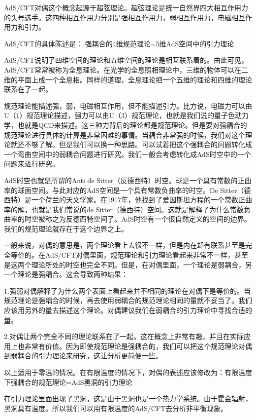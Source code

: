 
AdS/CFT对偶这个概念起源于超弦理论。超弦理论是统一自然界四大相互作用力的头号选手。这四种相互作用力分别是强相互作用力，弱相互作用力，电磁相互作用力和引力。

AdS/CFT的具体陈述是：
强耦合的4维规范理论=5维AdS空间中的引力理论

AdS/CFT说明了四维空间的理论和五维空间的理论是相互联系着的。由此可见，AdS/CFT常常被称为全息理论。在光学的全息照相理论中，三维的物体可以在二维的平面上成一个全息相。同样的道理，全息理论把一个五维的理论和四维的理论联系在了一起。

规范理论能描述强，弱，电磁相互作用，但不能描述引力。比方说，电磁力可以由U（1）规范理论描述，强力可以由U（3）规范理论，也就是我们说的量子色动力学，也就是QCD来描述。这三种力背后的理论都是规范理论。但是要对强耦合的规范理论进行具体的计算是非常困难的事情。当耦合非常强的时候，我们对这个理论就还不够了解。但是我们可以换一种思路。可以试着把这个强耦合的问题转化成一个弯曲空间中的弱耦合问题进行研究。我们一般会考虑转化成AdS时空中的一个问题来进行研究。

AdS时空也就是所谓的Anti de Sitter（反德西特）时空。球是一个具有常数的正曲率的球面空间。与此对应的AdS空间是一个具有常数负曲率的时空。De Sitter（德西特）是一个荷兰的天文学家。在1917年，他找到了爱因斯坦方程的一个常数正曲率的解，也就是我们常说的de Sitter（德西特）空间。这就是解释了为什么常数负曲率的时空被称之为反德西特空间了。AdS时空有一个很自然定义的空间的边界。我们的规范理论就存在于这个边界之上。

一般来说，对偶的意思是，两个理论看上去很不一样，但是内在却有联系甚至是完全等价的。在AdS/CFT对偶里面，规范理论和引力理论看起来非常不一样，甚至是这两个理论所处的时空也完全不同。但是，在对偶里面，一个理论是弱耦合，另一个理论是强耦合。这会导致两种结果：

1.强弱对偶解释了为什么两个表面上看起来并不相同的理论在对偶下是等价的。当规范理论是强耦合的时候，再去使用弱耦合的规范理论相同的量就不妥当了。我们应该用另外的量去描述这个理论。对偶建议我们在弱耦合的引力理论中寻找合适的量。

2.对偶让两个完全不同的理论联系在了一起。这在概念上非常有趣，并且在实际应用上也非常有价值。因为即使规范理论是强耦合的，我们可以把这个规范理论对偶到弱耦合的引力理论来研究，这让分析更简便一些。

以上适用于零温的情况。在有限温度的情况下，对偶的表述应该修改为：有限温度下强耦合的规范理论=AdS黑洞的引力理论

在引力理论里面出现了黑洞，这是由于黑洞也是一个热力学系统。由于霍金辐射，黑洞具有温度。所以我们可以用有限温度的AdS/CFT去分析非平衡现象。

